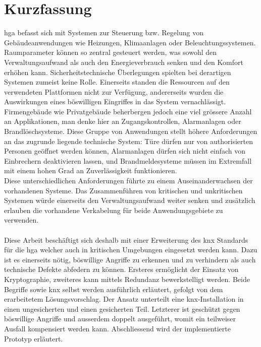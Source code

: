 \chapter*{Kurzfassung}
\gls{hga} befasst sich mit Systemen zur Steuerung bzw. Regelung von Gebäudeanwendungen wie Heizungen, Klimaanlagen oder Beleuchtungssystemen. Raumparameter
können so zentral gesteuert werden, was sowohl den Verwaltungsaufwand als auch den Energieverbrauch senken und den Komfort erhöhen kann. 
Sicherheitstechnische Überlegungen spielten bei derartigen Systemen zumeist keine Rolle.
Einerseits standen die Ressourcen auf den verwendeten Plattformen nicht zur Verfügung, andererseits wurden die Auswirkungen eines böswilligen Eingriffes in das System vernachlässigt.
\\
Firmengebäude wie Privatgebäude beherbergen jedoch eine viel grössere Anzahl an Applikationen, man denke hier an Zugangskontrollen, 
Alarmanlagen oder Brandlöschsysteme. Diese Gruppe von Anwendungen stellt höhere Anforderungen an das zugrunde liegende technische System:
Türe dürfen nur von authorisierten Personen geöffnet werden können, Alarmanlagen dürfen sich nicht einfach von Einbrechern deaktivieren lassen, und Brandmeldesysteme müssen im
Extremfall mit einem hohen Grad an Zuverlässigkeit funktionieren. 
\\
Diese unterschiedlichen Anforderungen führte zu einem Auseinanderwachsen der vorhandenen Systeme. Das Zusammenführen 
von kritischen und unkritischen Systemen würde einerseits den Verwaltungsaufwand weiter senken und zusätzlich erlauben die vorhandene Verkabelung für beide Anwendungsgebiete zu
verwenden.
\\
\\
Diese Arbeit beschäftigt sich deshalb mit einer Erweiterung des \gls{knx} Standards für die \gls{hga} welcher auch in kritischen Umgebungen eingesetzt werden kann.
Dazu ist es einerseits nötig, böswillige Angriffe zu erkennen und zu verhindern als auch technische Defekte abfedern zu können. Ersteres ermöglicht der Einsatz von Kryptographie,
zweiteres kann mittels Redundanz bewerkstelligt werden. Beide Begriffe sowie \gls{knx} selbst werden ausführlich erläutert, gefolgt von dem erarbeitetem Lösungsvorschlag.
Der Ansatz unterteilt eine \gls{knx}-Installation in einen ungesicherten und einen gesicherten Teil. Letzterer ist geschützt gegen böswillige Angriffe und ausserdem doppelt ausgeführt,
womit ein teilweiser Ausfall kompensiert werden kann. Abschliessend wird der implementierte Prototyp erläutert. 
